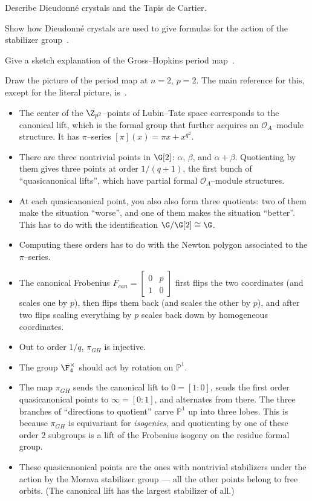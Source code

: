 Describe Dieudonn\'e crystals and the Tapis de Cartier.

Show how Dieudonn\'e crystals are used to give formulas for the action of the stabilizer group~\cite{DevinatzHopkins}.

Give a sketch explanation of the Gross--Hopkins period map~\cite{Weinstein}.

Draw the picture of the period map at $n = 2$, $p = 2$.  The main reference for this, except for the literal picture, is~\cite[Appendix 25]{HopkinsGrossEquivVBs}.
\begin{itemize}
\item The center of the $\Z_{p^2}$--points of Lubin--Tate space corresponds to the canonical lift, which is the formal group that further acquires an $\mathcal O_A$--module structure.  It has $\pi$--series $[\pi](x) = \pi x + x^{q^2}$.
\item There are three nontrivial points in $\G[2]$: $\alpha$, $\beta$, and $\alpha + \beta$.  Quotienting by them gives three points at order $1/(q+1)$, the first bunch of ``quasicanonical lifts'', which have partial formal $\mathcal O_A$--module structures.
\item At each quasicanonical point, you also also form three quotients: two of them make the situation ``worse'', and one of them makes the situation ``better''.  This has to do with the identification $\G / \G[2] \cong \G$.
\item Computing these orders has to do with the Newton polygon associated to the $\pi$--series.
\item The canonical Frobenius $F_{can} = \left[ \begin{array}{cc} 0 & p \\ 1 & 0 \end{array} \right]$ first flips the two coordinates (and scales one by $p$), then flips them back (and scales the other by $p$), and after two flips scaling everything by $p$ scales back down by homogeneous coordinates.
\item Out to order $1/q$, $\pi_{GH}$ is injective.
\item The group $\F_4^\times$ should act by rotation on $\mathbb P^1$.
\item The map $\pi_{GH}$ sends the canonical lift to $0 = [1:0]$, sends the first order quasicanonical points to $\infty = [0:1]$, and alternates from there.  The three branches of ``directions to quotient'' carve $\mathbb P^1$ up into three lobes.  This is because $\pi_{GH}$ is equivariant for \emph{isogenies}, and quotienting by one of these order $2$ subgroups is a lift of the Frobenius isogeny on the residue formal group.
\item These quasicanonical points are the ones with nontrivial stabilizers under the action by the Morava stabilizer group --- all the other points belong to free orbits.  (The canonical lift has the largest stabilizer of all.)
\end{itemize}

